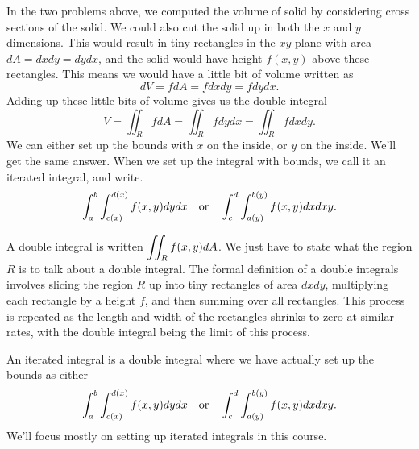 


In the two problems above, we computed the volume of solid by considering cross sections of the solid.  We could also cut the solid up in both the $x$ and $y$ dimensions.  This would result in tiny rectangles in the $xy$ plane with area $dA=dxdy=dydx$, and the solid would have height $f(x,y)$ above these rectangles.  This means we would have a little bit of volume written as  
$$dV=fdA=fdxdy=fdydx.$$ 
Adding up these little bits of volume gives us the double integral 
$$V = \iint_R fdA=\iint_R fdydx=\iint_R fdxdy.$$
We can either set up the bounds with $x$ on the inside, or $y$ on the inside. We'll get the same answer.  When we set up the integral with bounds, we call it an iterated integral, and write.
$$\displaystyle \int_a^b \int_{c(x)}^{d(x)}f(x,y)dydx \quad \text{or} \quad
\displaystyle \int_c^d \int_{a(y)}^{b(y)}f(x,y)dxdxy.$$

\begin{definition}
A double integral is written $\displaystyle \iint_R f(x,y)dA$.  We just have to state what the region $R$ is to talk about a double integral. The formal definition of a double integrals involves slicing the region $R$ up into tiny rectangles of area $dxdy$, multiplying each rectangle by a height $f$, and then summing over all rectangles. This process is repeated as the length and width of the rectangles shrinks to zero at similar rates, with the double integral being the limit of this process. 

An iterated integral is a double integral where we have actually set up 
the bounds as either 
$$\displaystyle \int_a^b \int_{c(x)}^{d(x)}f(x,y)dydx \quad \text{or} \quad
\displaystyle \int_c^d \int_{a(y)}^{b(y)}f(x,y)dxdxy.$$
We'll focus mostly on setting up iterated integrals in this course. 
\end{definition}


